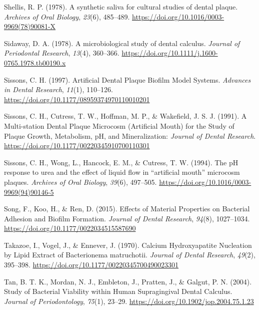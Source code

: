 \documentclass[
  letterpaper,
]{book}
\newlength{\cslhangindent}
\newlength{\cslentryspacingunit} %
\newenvironment{CSLReferences}[2] %
 {%
  \setlength{\parindent}{0pt}
  \ifodd #1
  \let\oldpar\par
  \def\par{\hangindent=\cslhangindent\oldpar}
  \fi
  \setlength{\parskip}{#2\cslentryspacingunit}
 }%
 {}
\begin{document}
\begin{CSLReferences}{1}{0}
\leavevmode{}%
Shellis, R. P. (1978). A synthetic saliva for cultural studies of dental
plaque. \emph{Archives of Oral Biology}, \emph{23}(6), 485--489.
\url{https://doi.org/10.1016/0003-9969(78)90081-X}

\leavevmode{}%
Sidaway, D. A. (1978). A microbiological study of dental calculus.
\emph{Journal of Periodontal Research}, \emph{13}(4), 360--366.
\url{https://doi.org/10.1111/j.1600-0765.1978.tb00190.x}

\leavevmode{}%
Sissons, C. H. (1997). Artificial {Dental Plaque Biofilm Model Systems}.
\emph{Advances in Dental Research}, \emph{11}(1), 110--126.
\url{https://doi.org/10.1177/08959374970110010201}

\leavevmode{}%
Sissons, C. H., Cutress, T. W., Hoffman, M. P., \& Wakefield, J. S. J.
(1991). A {Multi-station Dental Plaque Microcosm} ({Artificial Mouth})
for the {Study} of {Plaque Growth}, {Metabolism}, {pH}, and
{Mineralization}: \emph{Journal of Dental Research}.
\url{https://doi.org/10.1177/00220345910700110301}

\leavevmode{}%
Sissons, C. H., Wong, L., Hancock, E. M., \& Cutress, T. W. (1994). The
{pH} response to urea and the effect of liquid flow in {``artificial
mouth''} microcosm plaques. \emph{Archives of Oral Biology},
\emph{39}(6), 497--505.
\url{https://doi.org/10.1016/0003-9969(94)90146-5}

\leavevmode{}%
Song, F., Koo, H., \& Ren, D. (2015). Effects of {Material Properties}
on {Bacterial Adhesion} and {Biofilm Formation}. \emph{Journal of Dental
Research}, \emph{94}(8), 1027--1034.
\url{https://doi.org/10.1177/0022034515587690}

\leavevmode{}%
Takazoe, I., Vogel, J., \& Ennever, J. (1970). Calcium {Hydroxyapatite
Nucleation} by {Lipid Extract} of {Bacterionema} matruchotii.
\emph{Journal of Dental Research}, \emph{49}(2), 395--398.
\url{https://doi.org/10.1177/00220345700490023301}

\leavevmode{}%
Tan, B. T. K., Mordan, N. J., Embleton, J., Pratten, J., \& Galgut, P.
N. (2004). Study of {Bacterial Viability} within {Human Supragingival
Dental Calculus}. \emph{Journal of Periodontology}, \emph{75}(1),
23--29. \url{https://doi.org/10.1902/jop.2004.75.1.23}


\end{CSLReferences}
\end{document}
